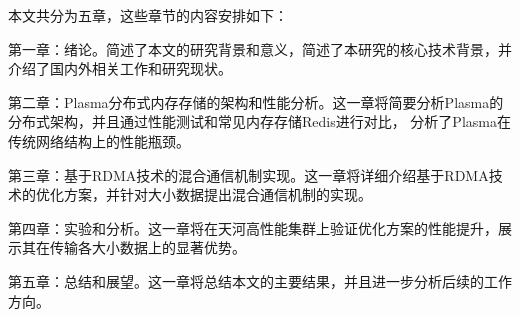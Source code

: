 本文共分为五章，这些章节的内容安排如下：

第一章：绪论。简述了本文的研究背景和意义，简述了本研究的核心技术背景，并介绍了国内外相关工作和研究现状。

第二章：Plasma分布式内存存储的架构和性能分析。这一章将简要分析Plasma的分布式架构，并且通过性能测试和常见内存存储Redis进行对比，
分析了Plasma在传统网络结构上的性能瓶颈。

第三章：基于RDMA技术的混合通信机制实现。这一章将详细介绍基于RDMA技术的优化方案，并针对大小数据提出混合通信机制的实现。

第四章：实验和分析。这一章将在天河高性能集群上验证优化方案的性能提升，展示其在传输各大小数据上的显著优势。

第五章：总结和展望。这一章将总结本文的主要结果，并且进一步分析后续的工作方向。
